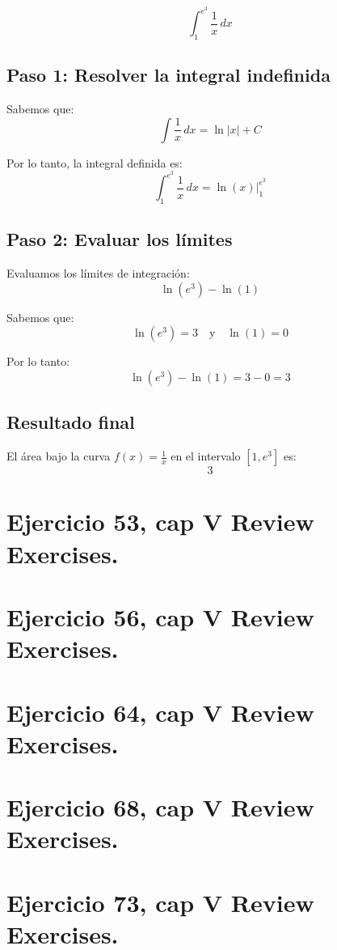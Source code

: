 \documentclass[11pt,letterpaper]{article}
\begin{document}
\[
\int_{1}^{e^3} \frac{1}{x} \, dx
\]

\subsection*{Paso 1: Resolver la integral indefinida}
Sabemos que:
\[
\int \frac{1}{x} \, dx = \ln|x| + C
\]

Por lo tanto, la integral definida es:
\[
\int_{1}^{e^3} \frac{1}{x} \, dx = \ln(x) \Big|_{1}^{e^3}
\]

\subsection*{Paso 2: Evaluar los límites}
Evaluamos los límites de integración:
\[
\ln(e^3) - \ln(1)
\]

Sabemos que:
\[
\ln(e^3) = 3 \quad \text{y} \quad \ln(1) = 0
\]

Por lo tanto:
\[
\ln(e^3) - \ln(1) = 3 - 0 = 3
\]

\subsection*{Resultado final}
El área bajo la curva \(f(x) = \frac{1}{x}\) en el intervalo \([1, e^3]\) es:
\[
\boxed{3}
\]


\section{Ejercicio 53, cap V Review Exercises.}

\section{Ejercicio 56, cap V Review Exercises.}

\section{Ejercicio 64, cap V Review Exercises.}

\section{Ejercicio 68, cap V Review Exercises.}

\section{Ejercicio 73, cap V Review Exercises.}
\end{document}
